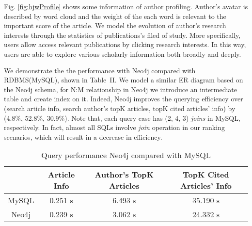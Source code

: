 \par
Fig. \ref{fig:hjwProfile} shows some information of author profiling. Author's avatar is described by word cloud and the weight of the each word is relevant to the important score of the article. We model the evolution of author's research interests through the statistics of publications's filed of study. More specifically, users allow access relevant publications by clicking research interests. In this way, users are able to explore various scholarly information both broadly and deeply. 



We demonstrate the the performance with Neo4j compared with RDBMS(MySQL), shown in Table~II. We model a similar ER diagram based on the Neo4j schema, for N:M relationship in Neo4j we introduce an intermediate table and create index on it. Indeed, Neo4j improves the querying efficiency over (search article info, search author's topK articles, topK cited articles' info) by (4.8\%, 52.8\%, 30.9\%). Note that, each query case has (2, 4, 3) {\em joins} in MySQL, respectively. In fact, almost all SQLs involve {\em join} operation in our ranking scenarios, which will result in a decrease in efficiency.



\begin{table}[t!]
\label{tab-compare}
\begin{center}
\caption{Query performance Neo4j compared with MySQL}
\begin{scriptsize}
\begin{tabular}{ c c c c}
\hline
{} & {Article Info} & {Author's TopK Articles} & {TopK Cited Articles' Info}\\
\hline
MySQL & 0.251 s  & 6.493 s & 35.190 s \\
Neo4j & 0.239 s  & 3.062 s & 24.332 s \\
\hline
\end{tabular} \\ %
\end{scriptsize}
\end{center}
\end{table}

